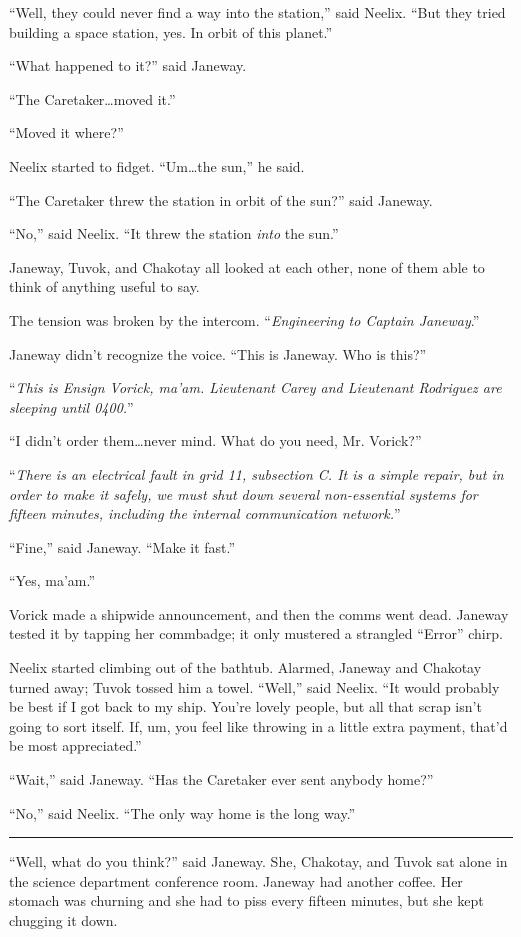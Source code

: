 \documentclass[twoside,letterpaper,12pt]{memoir}
\begin{document}
``Well, they could never find a way into the station,'' said Neelix. ``But they tried building a space station, yes. In orbit of this planet.''

``What happened to it?'' said Janeway.

``The Caretaker\ldots moved it.''

``Moved it where?''

Neelix started to fidget. ``Um\ldots the sun,'' he said.

``The Caretaker threw the station in orbit of the sun?'' said Janeway.

``No,'' said Neelix. ``It threw the station \textit{into} the sun.''

Janeway, Tuvok, and Chakotay all looked at each other, none of them able to think of anything useful to say.

The tension was broken by the intercom. ``\textit{Engineering to Captain Janeway}.''

Janeway didn't recognize the voice. ``This is Janeway. Who is this?''

``\textit{This is Ensign Vorick, ma'am. Lieutenant Carey and Lieutenant Rodriguez are sleeping until 0400.}''

``I didn't order them\ldots never mind. What do you need, Mr. Vorick?''

``\textit{There is an electrical fault in grid 11, subsection C. It is a simple repair, but in order to make it safely, we must shut down several non-essential systems for fifteen minutes, including the internal communication network.}''

``Fine,'' said Janeway. ``Make it fast.''

``Yes, ma'am.''

Vorick made a shipwide announcement, and then the comms went dead. Janeway tested it by tapping her commbadge; it only mustered a strangled ``Error'' chirp.

Neelix started climbing out of the bathtub. Alarmed, Janeway and Chakotay turned away; Tuvok tossed him a towel. ``Well,'' said Neelix. ``It would probably be best if I got back to my ship. You're lovely people, but all that scrap isn't going to sort itself. If, um, you feel like throwing in a little extra payment, that'd be most appreciated.''

``Wait,'' said Janeway. ``Has the Caretaker ever sent anybody home?''

``No,'' said Neelix. ``The only way home is the long way.''

\fancybreak{\rule{3cm}{0.4 pt}}
``Well, what do you think?'' said Janeway. She, Chakotay, and Tuvok sat alone in the science department conference room. Janeway had another coffee. Her stomach was churning and she had to piss every fifteen minutes, but she kept chugging it down.
\end{document}
